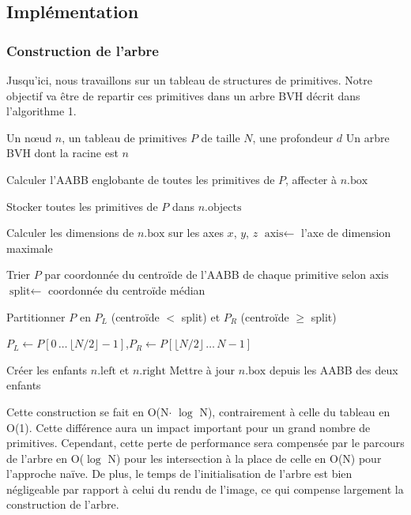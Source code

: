 \subsection{Implémentation}

\subsubsection{Construction de l'arbre}

Jusqu'ici, nous travaillons sur un tableau de structures de primitives. Notre objectif va être de repartir ces primitives dans un arbre BVH décrit dans l'algorithme 1.

\begin{algorithm}
\caption{Construction récursive de l'arbre BVH}
\begin{algorithmic}
\Require Un nœud $n$, un tableau de primitives $P$ de taille $N$, une profondeur $d$
\Ensure Un arbre BVH dont la racine est $n$

\State Calculer l'AABB englobante de toutes les primitives de $P$, affecter à $n.\text{box}$

    \State Stocker toutes les primitives de $P$ dans $n.\text{objects}$ 
    \State \Return
\EndIf

\State Calculer les dimensions de $n.\text{box}$ sur les axes $x$, $y$, $z$
\State $\text{axis} \leftarrow$ l'axe de dimension maximale

\State Trier $P$ par coordonnée du centroïde de l'AABB de chaque primitive selon $\text{axis}$
\State $\text{split} \leftarrow$ coordonnée du centroïde médian

\State Partitionner $P$ en $P_L$ (centroïde $<$ split) et $P_R$ (centroïde $\geq$ split)

    \State $P_L \leftarrow P[0\,\ldots\,\lfloor N/2 \rfloor - 1]$,\quad $P_R \leftarrow P[\lfloor N/2 \rfloor\,\ldots\,N-1]$
\EndIf

\State Créer les enfants $n.\text{left}$ et $n.\text{right}$
\State {}
\State {}
\State Mettre à jour $n.\text{box}$ depuis les AABB des deux enfants
\end{algorithmic}
\end{algorithm}


Cette construction se fait en O(N$\cdot$ $\log$ N), contrairement à celle du tableau en O(1). Cette différence aura un impact important pour un grand nombre de primitives. Cependant, cette perte de performance sera compensée par le parcours de l'arbre en O($\log$ N) pour les intersection à la place de celle en O(N) pour l'approche naïve. De plus, le temps de l'initialisation de l'arbre est bien négligeable par rapport à celui du rendu de l'image, ce qui compense largement la construction de l'arbre.


